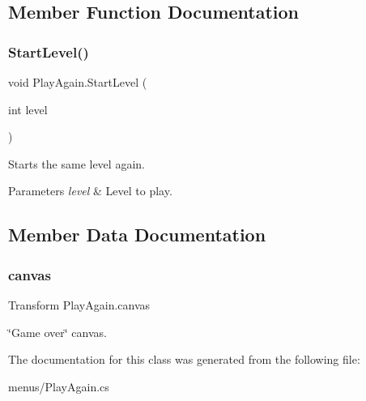 \subsection{Member Function Documentation}
\mbox{\label{class_play_again_af43857b80384f4ef6ef3bda6e8ac525c}} 
\subsubsection{\texorpdfstring{Start\+Level()}{StartLevel()}}
{\footnotesize\ttfamily void Play\+Again.\+Start\+Level (\begin{DoxyParamCaption}\item[{int}]{level }\end{DoxyParamCaption})}



Starts the same level again. 


\begin{DoxyParams}{Parameters}
{\em level} & Level to play.\\
\hline
\end{DoxyParams}


\subsection{Member Data Documentation}
\mbox{\label{class_play_again_ad48a4dfa626a86c3b686a6c66537612e}} 
\subsubsection{\texorpdfstring{canvas}{canvas}}
{\footnotesize\ttfamily Transform Play\+Again.\+canvas}



\char`\"{}\+Game over\char`\"{} canvas. 



The documentation for this class was generated from the following file\+:\begin{DoxyCompactItemize}
\item 
menus/Play\+Again.\+cs\end{DoxyCompactItemize}
